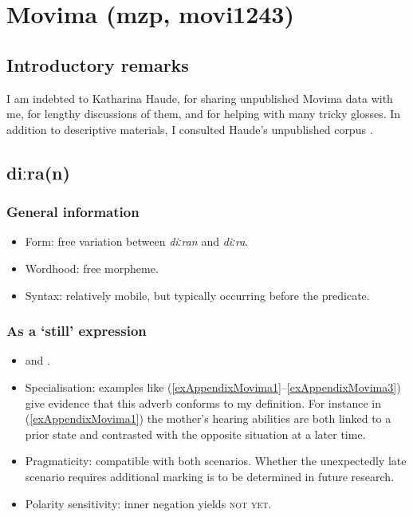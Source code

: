\section{Movima (mzp, movi1243)}
\subsection{Introductory remarks}
I am indebted to Katharina Haude, for sharing unpublished Movima data with me, for lengthy discussions of them, and for helping with many tricky glosses. In addition to descriptive materials, I consulted Haude's unpublished corpus \parencite{MovimaCorpus}.

\subsection{diːra(n)}
\subsubsection{General information}
\begin{itemize}
	\item Form: free variation between \textit{diːran} and \textit{diːra}.
	\item Wordhood: free morpheme.
	\item Syntax: relatively mobile, but typically occurring before the predicate.
\end{itemize}

\subsubsection{As a \lq{}still\rq{ }expression}
\begin{itemize}
	\item \textcite[520–521]{Haude2006} and \textcite[31, 82]{JudyJudy1962}.
	\item Specialisation: examples like (\ref{exAppendixMovima1}–\ref{exAppendixMovima3}) give evidence that this adverb conforms to my definition. For instance in (\ref{exAppendixMovima1}) the mother's hearing abilities are both linked to a prior state and contrasted with the opposite situation at a later time.
	\item Pragmaticity: compatible with both scenarios. Whether the unexpectedly late scenario requires additional marking is to be determined in future research.
	\item Polarity sensitivity: inner negation yields \textsc{not yet}.
\end{itemize}

